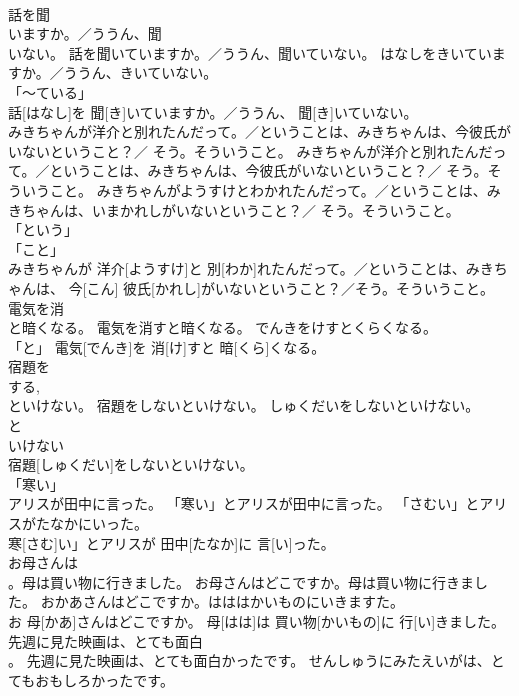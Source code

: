 \documentclass[8pt]{extreport}
\begin{document}
\begin{CJK}{UTF8}{min}
\\	話を聞
\\	いますか。／ううん、聞
\\	いない。	話を聞いていますか。／ううん、聞いていない。	はなしをきいていますか。／ううん、きいていない。	
\\	「～ている」 
\\	話[はなし]を 聞[き]いていますか。／ううん、 聞[き]いていない。		
\\	みきちゃんが洋介と別れたんだって。／ということは、みきちゃんは、今彼氏がいないということ？／ そう。そういうこと。	みきちゃんが洋介と別れたんだって。／ということは、みきちゃんは、今彼氏がいないということ？／ そう。そういうこと。	みきちゃんがようすけとわかれたんだって。／ということは、みきちゃんは、いまかれしがいないということ？／ そう。そういうこと。	
\\	「という」 
\\	「こと」 
\\	みきちゃんが 洋介[ようすけ]と 別[わか]れたんだって。／ということは、みきちゃんは、 今[こん] 彼氏[かれし]がいないということ？／そう。そういうこと。		
\\	電気を消
\\	と暗くなる。	電気を消すと暗くなる。	でんきをけすとくらくなる。	
\\	「と」	電気[でんき]を 消[け]すと 暗[くら]くなる。		
\\	宿題を
\\	する, 
\\	といけない。	宿題をしないといけない。	しゅくだいをしないといけない。	
\\	と
\\	いけない
\\	宿題[しゅくだい]をしないといけない。		
\\	「寒い」
\\	アリスが田中に言った。	「寒い」とアリスが田中に言った。	「さむい」とアリスがたなかにいった。	
\\	寒[さむ]い」とアリスが 田中[たなか]に 言[い]った。		
\\	お母さんは
\\	。母は買い物に行きました。	お母さんはどこですか。母は買い物に行きました。	おかあさんはどこですか。はははかいものにいきますた。	
\\	お 母[かあ]さんはどこですか。 母[はは]は 買い物[かいもの]に 行[い]きました。		
\\	先週に見た映画は、とても面白
\\	。	先週に見た映画は、とても面白かったです。	せんしゅうにみたえいがは、とてもおもしろかったです。	

\end{CJK}
\end{document}
